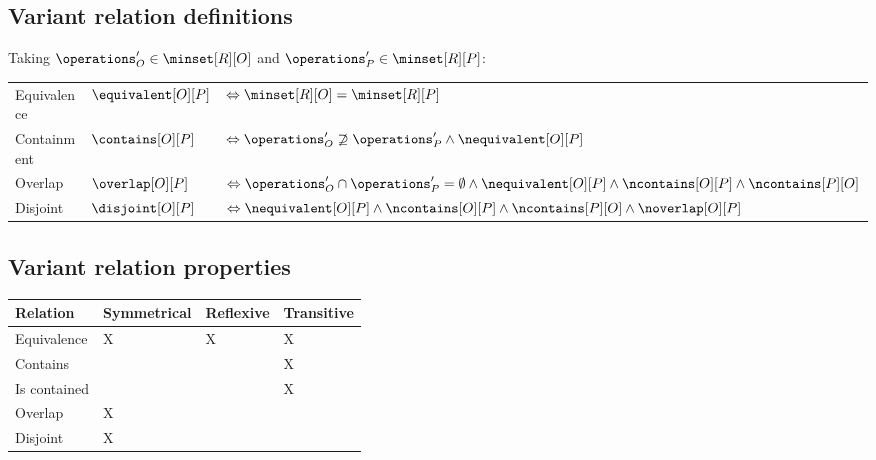 \subsection*{Variant relation definitions}
%
Taking $\operations_O' \in \minset[R][O]$ and $\operations_P' \in \minset[R][P]$:
%
\begin{table}[h!]
    \begin{tabular}{l l l}
        Equivalence & $\equivalent[O][P]$ & $\Leftrightarrow \minset[R][O] = \minset[R][P]$ \\
        Containment & $\contains[O][P]$   & $\Leftrightarrow \operations_O' \not\supseteq \operations_P' \land \nequivalent[O][P]  $ \\
        Overlap     & $\overlap[O][P]$    & $\Leftrightarrow \operations_O' \cap \operations_P' = \emptyset \land \nequivalent[O][P] \land \ncontains[O][P] \land \ncontains[P][O]$ \\
        Disjoint   & $\disjoint[O][P]$ & $\Leftrightarrow \nequivalent[O][P] \land \ncontains[O][P] \land \ncontains[P][O] \land \noverlap[O][P]$
    \end{tabular}
\end{table}
%
\subsection*{Variant relation properties}
%
\begin{table}[h!]
    \begin{tabular}{|l|l|l|l|}
        \hline
        \textbf{Relation} & \textbf{Symmetrical} & \textbf{Reflexive} & \textbf{Transitive} \\
        \hline
        Equivalence       & X                    & X                  & X \\
        \hline 
        Contains          &                      &                    & X \\
        \hline 
        Is contained      &                      &                    & X \\
        \hline 
        Overlap           & X                    &                    &   \\
        \hline 
        Disjoint          & X                    &                    &   \\
        \hline
    \end{tabular}
\end{table}